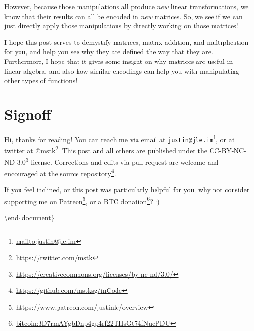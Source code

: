 \documentclass[]{article}
\renewcommand{\href}[2]{#2\footnote{\url{#1}}}
\begin{document}
However, because those manipulations all produce \emph{new} linear
transformations, we know that their results can all be encoded in \emph{new}
matrices. So, we see if we can just directly apply those manipulations by
directly working on those matrices!

I hope this post serves to demystify matrices, matrix addition, and
multiplication for you, and help you see why they are defined the way that they
are. Furthermore, I hope that it gives some insight on why matrices are useful
in linear algebra, and also how similar encodings can help you with manipulating
other types of functions!

\section{Signoff}\label{signoff}

Hi, thanks for reading! You can reach me via email at
\href{mailto:justin@jle.im}{\nolinkurl{justin@jle.im}}, or at twitter at
\href{https://twitter.com/mstk}{@mstk}! This post and all others are published
under the \href{https://creativecommons.org/licenses/by-nc-nd/3.0/}{CC-BY-NC-ND
3.0} license. Corrections and edits via pull request are welcome and encouraged
at \href{https://github.com/mstksg/inCode}{the source repository}.

If you feel inclined, or this post was particularly helpful for you, why not
consider \href{https://www.patreon.com/justinle/overview}{supporting me on
Patreon}, or a \href{bitcoin:3D7rmAYgbDnp4gp4rf22THsGt74fNucPDU}{BTC donation}?
:)

\textbackslash end\{document\}
\end{document}
